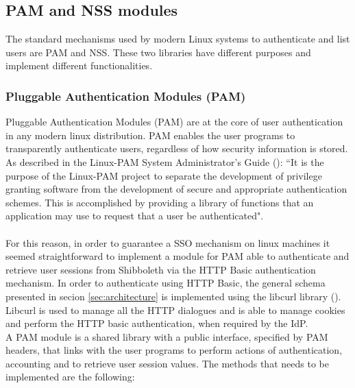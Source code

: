 \label{sec:pamnss}
\subsection{PAM and NSS modules}
The standard mechanisms used by modern Linux systems to authenticate and list users are PAM and NSS.
These two libraries have different purposes and implement different functionalities.

\label{sec:pam}
\subsubsection{Pluggable Authentication Modules (PAM)}
Pluggable Authentication Modules (PAM) are at the core of user authentication in any modern linux distribution.
PAM enables the user programs to transparently authenticate users, regardless of how security information is stored.
As described in the Linux-PAM System Administrator's Guide (\cite{Morgan-1996}): ``It is the purpose of the Linux-PAM project to separate
the development of privilege granting software from the development of secure and appropriate authentication schemes.
This is accomplished by providing a library of functions that an application may use to request that a user be authenticated".\\
\\
For this reason, in order to guarantee a SSO mechanism on linux machines it seemed straightforward to implement a module for
PAM able to authenticate and retrieve user sessions from Shibboleth via the HTTP Basic authentication mechanism.
In order to authenticate using HTTP Basic, the general schema presented in secion \ref{sec:architecture} is implemented using the
libcurl library (\cite{Stenberg-1996}).\\
Libcurl is used to manage all the HTTP dialogues and is able to manage cookies and perform the HTTP basic authentication, when
required by the IdP.
\\
A PAM module is a shared library with a public interface, specified by PAM headers, that links with the user programs to perform
actions of authentication, accounting and to retrieve user session values.
The methods that needs to be implemented are the following:
